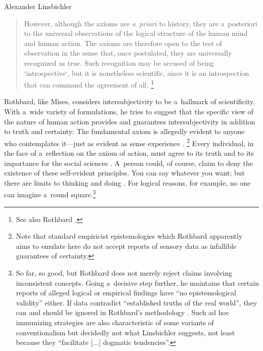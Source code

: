 \begin{artengenv}{Alexander Linsbichler}
\begin{quote}
However, although the axioms are \textit{a~priori} to history, they are a~posteriori to the universal observations of the logical structure of the human mind and human action. The axioms are therefore open to the test of observation in the sense that, once postulated, they are universally recognized as true. Such recognition may be accused of being ‘introspective‘, but it is nonetheless scientific, since it is an introspection that can command the agreement of all. 
\parencite[][p.181]{rothbard_mises_1951}%
\footnote{See also Rothbard 
\parencite*[][pp.317–318]{rothbard_defense_1957}.%
}
\end{quote}



Rothbard, like Mises, considers intersubjectivity to be a~hallmark of scientificity. With a~wide variety of formulations, he tries to suggest that the specific view of the nature of human action provides and guarantees intersubjectivity in addition to truth and certainty: The fundamental axiom is allegedly evident to anyone who contemplates it---just as evident as sense experience 
\parencite[][p.35]{rothbard_praxeology_2011}.%
\footnote{Note that standard empiricist epistemologies which Rothbard apparently aims to emulate here do not accept reports of sensory data as infallible guarantees of certainty.} Every individual, in the face of a~reflection on the axiom of action, must agree to its truth and to its importance for the social sciences 
\parencite[][p.943]{rothbard_praxeology_1951}. %
 A~person could, of course, claim to deny the existence of these self-evident principles. You can say whatever you want; but there are limits to thinking and doing 
\parencite[][p.28]{rothbard_praxeology:_1976}. %
 For logical reasons, for example, no one can imagine a~round square.\footnote{So far, so good, but Rothbard does not merely reject claims involving inconsistent concepts. Going a~decisive step further, he maintains that certain reports of alleged logical or empirical findings have ``no epistemological validity'' either. If data contradict ``established truths of the real world'', they can and should be ignored in Rothbard's methodology 
\parencite*[][p.28]{rothbard_praxeology:_1976}. %
 Such ad hoc immunizing strategies are also characteristic of some variants of conventionalism but decidedly not what Linsbichler 
\parencite*[][p.3370]{linsbichler_austrian_2021} %
 suggests, not least because they ``facilitate [...] dogmatic tendencies''.}




\end{artengenv}

